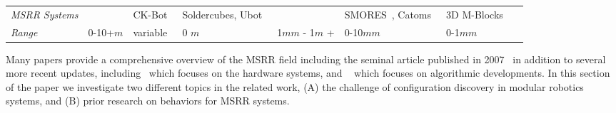 \begin{table*}[h]
\begin{tabular}{ p{2.4 cm} p{\wdd}  p{\wdd} p{\wdd} p{\wdd} p{\wdd} p{\wdd} p{\wdd}  }
		\addlinespace[1ex] 	\textit{MSRR Systems}
		& \cite{StigmergyWerfel2006}	%
		& CK-Bot~\cite{park2008automatic}					%
		& Soldercubes\cite{Soldercubes2016}, Ubot~\cite{ubot-Zhu-2014}	%
		& \cite{lin2017vision}								%
		& SMORES~\cite{TosunDaveyLiuYim-IROS2016}, Catoms~\cite{Kirby-IROS07}					%
		& 3D M-Blocks~\cite{Romanishin20153d}	\\ 			%
		
		\addlinespace[1ex] 	\textit{Range}										& 0-10+$m$		& variable				& 0 $m$								& 1$mm$ - 1$m$ +		& 0-10$mm$				& 0-1$mm$	\\
	\end{tabular}
	\label{tab:tagTech}
\end{table*}


Many papers provide a comprehensive overview of the MSRR field including the seminal article published in 2007~\cite{Yim-RAM07} in addition to several more recent updates, including~\cite{chennareddy2017modular} which focuses on the hardware systems, and ~\cite{abukhalil2013survey} which focuses on algorithmic developments. In this section of the paper we investigate two different topics in the related work, (A) the challenge of configuration discovery in modular robotics systems, and (B) prior research on behaviors for MSRR systems.

